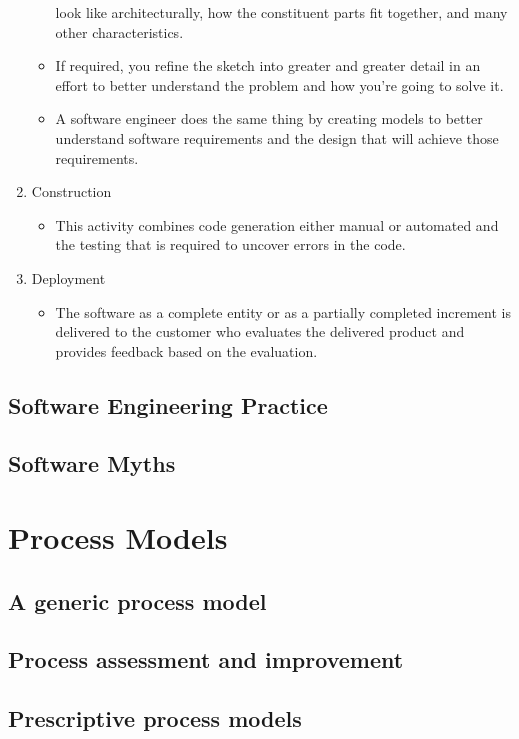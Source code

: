 \documentclass{article}
\begin{document}
\begin{enumerate}
\begin{itemize}
					look like architecturally, how the constituent parts fit together, and many other
					characteristics.
				\item If required, you refine the sketch into greater and greater detail in an effort to better
					understand the problem and how you're going to solve it.
				\item A software engineer does the same thing by creating models to better understand software
					requirements and the design that will achieve those requirements.
			\end{itemize}
		\item Construction
			\begin{itemize}
 				\item This activity combines code generation either manual or automated and the testing that is
					required to uncover errors in the code.
			\end{itemize}
		\item Deployment
			\begin{itemize}
				\item The software as a complete entity or as a partially completed increment is delivered to
					the customer who evaluates the delivered product and provides feedback based on the
					evaluation.
			\end{itemize}
	\end{enumerate}

	\subsection{Software Engineering Practice}
	\subsection{Software Myths}

	\section{Process Models}
	\subsection{A generic process model}
	\subsection{Process assessment and improvement}

	\subsection{Prescriptive process models}
\end{document}
